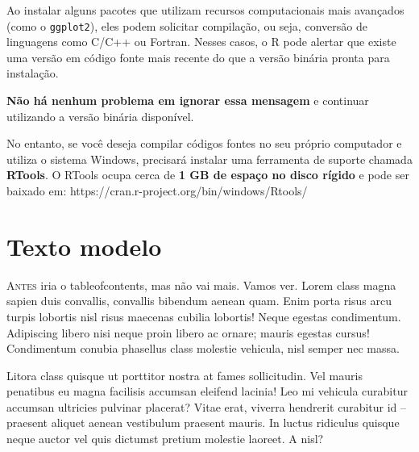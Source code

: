 \documentclass[
  brazilian,
  11pt,
  a4paper,
  open = right,
  twoside = true]{scrbook}
\begin{document}
\begin{tcolorbox}[enhanced jigsaw, arc=.35mm, bottomrule=.15mm, bottomtitle=1mm, breakable, colback=white, colbacktitle=quarto-callout-note-color!10!white, colframe=quarto-callout-note-color-frame, coltitle=black, left=2mm, leftrule=.75mm, opacityback=0, opacitybacktitle=0.6, rightrule=.15mm, title=\textcolor{quarto-callout-note-color}{\faInfo}\hspace{0.5em}{Sobre a Instalação do RTools (Apenas para Windows)}, titlerule=0mm, toprule=.15mm, toptitle=1mm]

Ao instalar alguns pacotes que utilizam recursos computacionais mais
avançados (como o \texttt{ggplot2}), eles podem solicitar compilação, ou
seja, conversão de linguagens como C/C++ ou Fortran. Nesses casos, o R
pode alertar que existe uma versão em código fonte mais recente do que a
versão binária pronta para instalação.

\textbf{Não há nenhum problema em ignorar essa mensagem} e continuar
utilizando a versão binária disponível.

No entanto, se você deseja compilar códigos fontes no seu próprio
computador e utiliza o sistema Windows, precisará instalar uma
ferramenta de suporte chamada \textbf{RTools}. O RTools ocupa cerca de
\textbf{1 GB de espaço no disco rígido} e pode ser baixado em:
https://cran.r-project.org/bin/windows/Rtools/

\end{tcolorbox}

\chapter{Texto modelo}\label{texto-modelo}

\lettrine{A}{ntes} iria o tableofcontents, mas não vai mais. Vamos ver.
Lorem class magna sapien duis convallis, convallis bibendum aenean quam.
Enim porta risus arcu turpis lobortis nisl risus maecenas cubilia
lobortis! Neque egestas condimentum. Adipiscing libero nisi neque proin
libero ac ornare; mauris egestas cursus! Condimentum conubia phasellus
class molestie vehicula, nisl semper nec massa.

Litora class quisque ut porttitor nostra at fames sollicitudin. Vel
mauris penatibus eu magna facilisis accumsan eleifend lacinia! Leo mi
vehicula curabitur accumsan ultricies pulvinar placerat? Vitae erat,
viverra hendrerit curabitur id -- praesent aliquet aenean vestibulum
praesent mauris. In luctus ridiculus quisque neque auctor vel quis
dictumst pretium molestie laoreet. A nisl?
\end{document}

